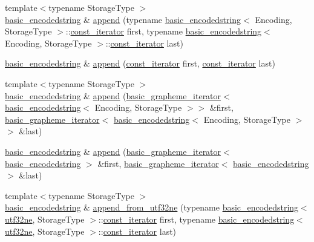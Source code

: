 \begin{DoxyCompactItemize}
\item 
{\footnotesize template$<$typename Storage\+Type $>$ }\\\hyperlink{classu5e_1_1basic__encodedstring}{basic\+\_\+encodedstring} \& \hyperlink{classu5e_1_1basic__encodedstring_a7c2f3d7fbdc7abe4d98100e914c58432}{append} (typename \hyperlink{classu5e_1_1basic__encodedstring}{basic\+\_\+encodedstring}$<$ Encoding, Storage\+Type $>$\+::\hyperlink{classu5e_1_1basic__encodedstring_a249da58e8bad9c91fab547516f90c60d}{const\+\_\+iterator} first, typename \hyperlink{classu5e_1_1basic__encodedstring}{basic\+\_\+encodedstring}$<$ Encoding, Storage\+Type $>$\+::\hyperlink{classu5e_1_1basic__encodedstring_a249da58e8bad9c91fab547516f90c60d}{const\+\_\+iterator} last)
\item 
\hyperlink{classu5e_1_1basic__encodedstring}{basic\+\_\+encodedstring} \& \hyperlink{classu5e_1_1basic__encodedstring_a5ecfdb33d48ffa64ffe37e53b1e0afca}{append} (\hyperlink{classu5e_1_1basic__encodedstring_a249da58e8bad9c91fab547516f90c60d}{const\+\_\+iterator} first, \hyperlink{classu5e_1_1basic__encodedstring_a249da58e8bad9c91fab547516f90c60d}{const\+\_\+iterator} last)
\item 
{\footnotesize template$<$typename Storage\+Type $>$ }\\\hyperlink{classu5e_1_1basic__encodedstring}{basic\+\_\+encodedstring} \& \hyperlink{classu5e_1_1basic__encodedstring_a640ee5bdb029183dd80a0ecec9fa654e}{append} (\hyperlink{classu5e_1_1basic__grapheme__iterator}{basic\+\_\+grapheme\+\_\+iterator}$<$ \hyperlink{classu5e_1_1basic__encodedstring}{basic\+\_\+encodedstring}$<$ Encoding, Storage\+Type $>$$>$ \&first, \hyperlink{classu5e_1_1basic__grapheme__iterator}{basic\+\_\+grapheme\+\_\+iterator}$<$ \hyperlink{classu5e_1_1basic__encodedstring}{basic\+\_\+encodedstring}$<$ Encoding, Storage\+Type $>$$>$ \&last)
\item 
\hyperlink{classu5e_1_1basic__encodedstring}{basic\+\_\+encodedstring} \& \hyperlink{classu5e_1_1basic__encodedstring_a39b67e509add304644ce00ebc5271f8f}{append} (\hyperlink{classu5e_1_1basic__grapheme__iterator}{basic\+\_\+grapheme\+\_\+iterator}$<$ \hyperlink{classu5e_1_1basic__encodedstring}{basic\+\_\+encodedstring} $>$ \&first, \hyperlink{classu5e_1_1basic__grapheme__iterator}{basic\+\_\+grapheme\+\_\+iterator}$<$ \hyperlink{classu5e_1_1basic__encodedstring}{basic\+\_\+encodedstring} $>$ \&last)
\item 
{\footnotesize template$<$typename Storage\+Type $>$ }\\\hyperlink{classu5e_1_1basic__encodedstring}{basic\+\_\+encodedstring} \& \hyperlink{classu5e_1_1basic__encodedstring_acbc86737292f60ea4bc9eba17873378d}{append\+\_\+from\+\_\+utf32ne} (typename \hyperlink{classu5e_1_1basic__encodedstring}{basic\+\_\+encodedstring}$<$ \hyperlink{classu5e_1_1utf32ne}{utf32ne}, Storage\+Type $>$\+::\hyperlink{classu5e_1_1basic__encodedstring_a249da58e8bad9c91fab547516f90c60d}{const\+\_\+iterator} first, typename \hyperlink{classu5e_1_1basic__encodedstring}{basic\+\_\+encodedstring}$<$ \hyperlink{classu5e_1_1utf32ne}{utf32ne}, Storage\+Type $>$\+::\hyperlink{classu5e_1_1basic__encodedstring_a249da58e8bad9c91fab547516f90c60d}{const\+\_\+iterator} last)

\end{DoxyCompactItemize}
